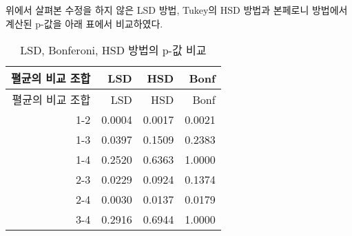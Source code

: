 \documentclass[
]{book}
\begin{document}
위에서 살펴본 수정을 하지 않은 LSD 방법, Tukey의 HSD 방법과 본페로니
방법에서 계산된 p-값을 아래 표에서 비교하였다.

\begin{longtable}[]{@{}rrrr@{}}
\caption{LSD, Bonferoni, HSD 방법의 p-값 비교}\tabularnewline
\toprule
펼균의 비교 조합 & LSD & HSD & Bonf\tabularnewline
\midrule
\endfirsthead
\toprule
펼균의 비교 조합 & LSD & HSD & Bonf\tabularnewline
\midrule
\endhead
1-2 & 0.0004 & 0.0017 & 0.0021\tabularnewline
1-3 & 0.0397 & 0.1509 & 0.2383\tabularnewline
1-4 & 0.2520 & 0.6363 & 1.0000\tabularnewline
2-3 & 0.0229 & 0.0924 & 0.1374\tabularnewline
2-4 & 0.0030 & 0.0137 & 0.0179\tabularnewline
3-4 & 0.2916 & 0.6944 & 1.0000\tabularnewline
\bottomrule
\end{longtable}

  
\end{document}
